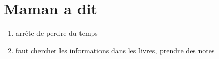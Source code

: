 \documentclass[../main.tex]{subfiles}
\begin{document}
\section{Maman a dit}

\begin{enumerate}
    \item arrête de perdre du temps
    \item faut chercher les informations dans les livres, prendre des notes
\end{enumerate}
    
    
\end{document}
